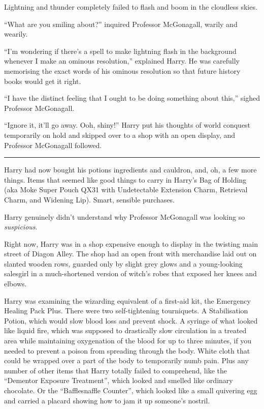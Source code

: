 Lightning and thunder completely failed to flash and boom in the
cloudless skies.

``What are you smiling about?'' inquired Professor McGonagall, warily
and wearily.

``I'm wondering if there's a spell to make lightning flash in the
background whenever I make an ominous resolution,'' explained Harry. He
was carefully memorising the exact words of his ominous resolution so
that future history books would get it right.

``I have the distinct feeling that I ought to be doing something about
this,'' sighed Professor McGonagall.

``Ignore it, it'll go away. Ooh, shiny!'' Harry put his thoughts of
world conquest temporarily on hold and skipped over to a shop with an
open display, and Professor McGonagall followed.

\begin{center}\rule{3in}{0.4pt}\end{center}

Harry had now bought his potions ingredients and cauldron, and, oh, a
few more things. Items that seemed like good things to carry in Harry's
Bag of Holding (aka Moke Super Pouch QX31 with Undetectable Extension
Charm, Retrieval Charm, and Widening Lip). Smart, sensible purchases.

Harry genuinely didn't understand why Professor McGonagall was looking
so \emph{suspicious}.

Right now, Harry was in a shop expensive enough to display in the
twisting main street of Diagon Alley. The shop had an open front with
merchandise laid out on slanted wooden rows, guarded only by slight grey
glows and a young-looking salesgirl in a much-shortened version of
witch's robes that exposed her knees and elbows.

Harry was examining the wizarding equivalent of a first-aid kit, the
Emergency Healing Pack Plus. There were two self-tightening tourniquets.
A Stabilisation Potion, which would slow blood loss and prevent shock. A
syringe of what looked like liquid fire, which was supposed to
drastically slow circulation in a treated area while maintaining
oxygenation of the blood for up to three minutes, if you needed to
prevent a poison from spreading through the body. White cloth that could
be wrapped over a part of the body to temporarily numb pain. Plus any
number of other items that Harry totally failed to comprehend, like the
``Dementor Exposure Treatment'', which looked and smelled like ordinary
chocolate. Or the ``Bafflesnaffle Counter'', which looked like a small
quivering egg and carried a placard showing how to jam it up someone's
nostril.

